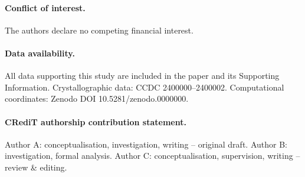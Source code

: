 \documentclass[12pt,a4paper]{article}
\begin{document}
\paragraph{Conflict of interest.}
The authors declare no competing financial interest.

\paragraph{Data availability.}
All data supporting this study are included in the paper and its Supporting
Information. Crystallographic data: CCDC 2400000--2400002. Computational
coordinates: Zenodo DOI 10.5281/zenodo.0000000.

\paragraph{CRediT authorship contribution statement.}
Author A: conceptualisation, investigation, writing -- original draft.
Author B: investigation, formal analysis. Author C: conceptualisation,
supervision, writing -- review \& editing.


\end{document}
